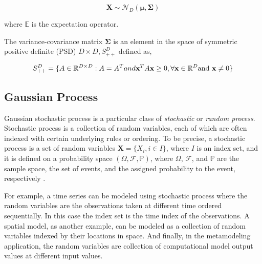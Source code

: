 \begin{equation}
	\boldsymbol{X} \sim \mathcal{N}_D\left(\boldsymbol{\mu}, \boldsymbol{\Sigma}\right)
\end{equation}

where $\mathbb{E}$ is the expectation operator.

The variance-covariance matrix $\boldsymbol{\Sigma}$ is an element in the space of symmetric positive definite (PSD) $D \times D, S_{++}^D$ defined as,

\begin{equation}
	S_{++}^D = \{A \in \mathbb{R}^{D\times D}: A = A^T and \mathbf{x}^T A \mathbf{x} \geq 0, \forall \mathbf{x} \in \mathbb{R}^D \textnormal{and } \mathbf{x} \neq 0 \}
	\label{eq:covariance_matrix}
\end{equation}

\subsection{Gaussian Process}

Gaussian stochastic process is a particular class of \emph{stochastic} or \emph{random process}.
Stochastic process is a collection of random variables, each of which are often indexed with certain underlying rules or ordering.
To be precise, a stochastic process is a set of random variables $\mathbf{X} = \{X_i, i \in I\}$, where $I$ is an index set, 
and it is defined on a probability space $(\Omega, \mathcal{F}, \mathbb{P})$, 
where $\Omega$, $\mathcal{F}$, and $\mathbb{P}$ are the sample space, the set of events, and the assigned probability to the event, respectively \cite{Syski2014}.

For example, a time series can be modeled using stochastic process where the random variables are the observations taken at different time ordered sequentially.
In this case the index set is the time index of the observations.
A spatial model, as another example, can be modeled as a collection of random variables indexed by their locations in space.
And finally, in the metamodeling application, the random variables are collection of computational model output values at different input values.

